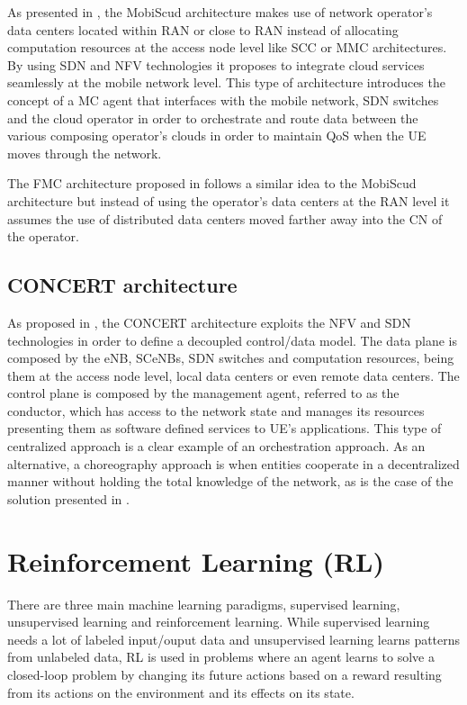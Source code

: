 As presented in \cite{MobiScud}, the \acrfull{MobiScud} architecture makes use of network operator's data centers located within \acrshort{RAN} or close to \acrshort{RAN} instead of allocating computation resources at the access node level like \acrshort{SCC} or \acrshort{MMC} architectures. By using \acrfull{SDN} and \acrfull{NFV} technologies it proposes to integrate cloud services seamlessly at the mobile network level. This type of architecture introduces the concept of a \acrfull{MC} agent that interfaces with the mobile network, \acrshort{SDN} switches and the cloud operator in order to orchestrate and route data between the various composing operator's clouds in order to maintain \acrshort{QoS} when the \acrshort{UE} moves through the network.

The \acrfull{FMC} architecture proposed in \cite{fmcloud} follows a similar idea to the \acrshort{MobiScud} architecture but instead of using the operator's data centers at the RAN level it assumes the use of distributed data centers moved farther away into the \acrfull{CN} of the operator.

\subsection{CONCERT architecture}
\noindent As proposed in \cite{CONCERT}, the CONCERT architecture exploits the \acrshort{NFV} and \acrshort{SDN} technologies in order to define a decoupled control/data model.
The data plane is composed by the \acrshort{eNB}, \acrshort{SCeNBs}, \acrshort{SDN} switches and computation resources, being them at the access node level, local data centers or even remote data centers.
The control plane is composed by the management agent, referred to as the conductor, which has access to the network state and manages its resources presenting them as software defined services to \acrshort{UE}'s applications. This type of centralized approach is a clear example of an orchestration approach. As an alternative, a choreography approach is when entities cooperate in a decentralized manner without holding the total knowledge of the network, as is the case of the solution presented in \cite{fogmulti}.

\section{Reinforcement Learning (RL)} \label{section:RL}
\noindent There are three main machine learning paradigms, supervised learning, unsupervised learning and reinforcement learning. While supervised learning needs a lot of labeled input/ouput data and unsupervised learning learns patterns from unlabeled data, \acrfull{RL} is used in problems where an agent learns to solve a closed-loop problem by changing its future actions based on a reward resulting from its actions on the environment and its effects on its state.

